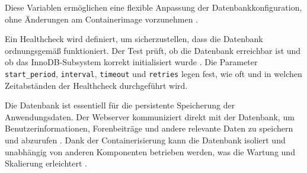 Diese Variablen ermöglichen eine flexible Anpassung der Datenbankkonfiguration, ohne Änderungen am Containerimage vorzunehmen \cite{environment_variables}.

Ein Healthcheck wird definiert, um sicherzustellen, dass die Datenbank ordnungsgemäß funktioniert. Der Test prüft, ob die Datenbank erreichbar ist und ob das InnoDB-Subsystem korrekt initialisiert wurde \cite{docker_healthcheck}. Die Parameter \texttt{start\_period}, \texttt{interval}, \texttt{timeout} und \texttt{retries} legen fest, wie oft und in welchen Zeitabständen der Healthcheck durchgeführt wird.

Die Datenbank ist essentiell für die persistente Speicherung der Anwendungsdaten. Der Webserver kommuniziert direkt mit der Datenbank, um Benutzerinformationen, Forenbeiträge und andere relevante Daten zu speichern und abzurufen \cite{mariadb_communication}. Dank der Containerisierung kann die Datenbank isoliert und unabhängig von anderen Komponenten betrieben werden, was die Wartung und Skalierung erleichtert \cite{watada2019}.